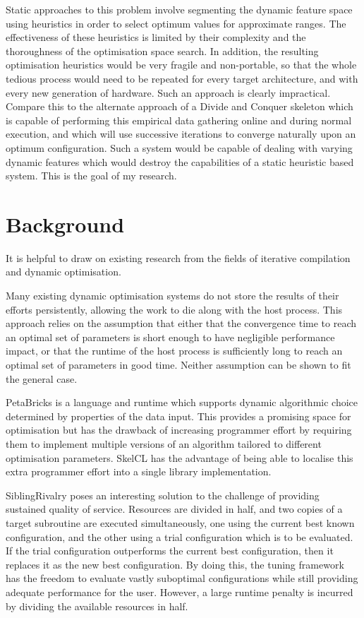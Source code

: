 Static approaches to this problem involve segmenting the dynamic
feature space using heuristics in order to select optimum values for
approximate ranges. The effectiveness of these heuristics is limited
by their complexity and the thoroughness of the optimisation space
search. In addition, the resulting optimisation heuristics would be
very fragile and non-portable, so that the whole tedious process would
need to be repeated for every target architecture, and with every new
generation of hardware. Such an approach is clearly
impractical. Compare this to the alternate approach of a Divide and
Conquer skeleton which is capable of performing this empirical data
gathering online and during normal execution, and which will use
successive iterations to converge naturally upon an optimum
configuration. Such a system would be capable of dealing with varying
dynamic features which would destroy the capabilities of a static
heuristic based system. This is the goal of my research.

\section{Background}

It is helpful to draw on existing research from the fields of
iterative compilation and dynamic optimisation.

Many existing dynamic optimisation systems do not store the results of
their efforts persistently, allowing the work to die along with the
host process. This approach relies on the assumption that either that
the convergence time to reach an optimal set of parameters is short
enough to have negligible performance impact, or that the runtime of
the host process is sufficiently long to reach an optimal set of
parameters in good time. Neither assumption can be shown to fit the
general case.

PetaBricks is a language and runtime which supports dynamic
algorithmic choice determined by properties of the data input. This
provides a promising space for optimisation but has the drawback of
increasing programmer effort by requiring them to implement multiple
versions of an algorithm tailored to different optimisation
parameters. SkelCL has the advantage of being able to localise this
extra programmer effort into a single library implementation.

SiblingRivalry poses an interesting solution to the challenge of
providing sustained quality of service. Resources are divided in half,
and two copies of a target subroutine are executed simultaneously, one
using the current best known configuration, and the other using a
trial configuration which is to be evaluated. If the trial
configuration outperforms the current best configuration, then it
replaces it as the new best configuration. By doing this, the tuning
framework has the freedom to evaluate vastly suboptimal configurations
while still providing adequate performance for the user. However, a
large runtime penalty is incurred by dividing the available resources
in half.

